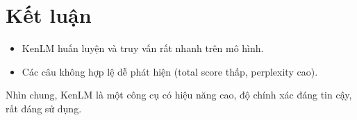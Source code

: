 \documentclass[12pt]{article}
\begin{document}
\section{Kết luận}
\begin{itemize}
\item KenLM huấn luyện và truy vấn rất nhanh trên mô hình.
\item Các câu không hợp lệ dễ phát hiện (total score thấp, perplexity cao).
\end{itemize}
\noindent Nhìn chung, KenLM là một công cụ có hiệu năng cao, độ chính xác đáng tin cậy, rất đáng sử dụng.

\cleardoublepage
{}
{}


\end{document}
